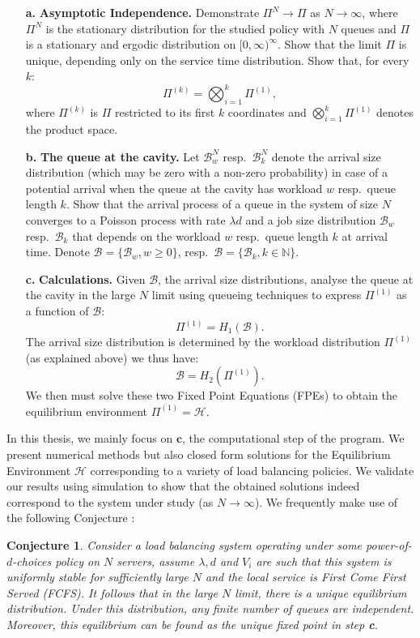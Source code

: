 \documentclass[12pt]{report}
\newtheorem{conjecture}{Conjecture}
\begin{document}
\begin{itemize}
	\item[\textbf{a.}] \textbf{Asymptotic Independence.} Demonstrate $\Pi^N \rightarrow \Pi$ as $N \rightarrow \infty$, where $\Pi^N$ is the stationary distribution for the studied policy with $N$ queues and $\Pi$ is a stationary and ergodic distribution on $[0,\infty)^\infty$. Show that the limit $\Pi$ is unique, depending only on the service time distribution. Show that, for every $k$:
	$$
	\Pi^{(k)} = \bigotimes_{i=1}^k \Pi^{(1)},
	$$
	where $\Pi^{(k)}$ is $\Pi$ restricted to its first $k$ coordinates and $\bigotimes_{i=1}^k \Pi^{(1)}$ denotes the product space.
	\item[\textbf{b.}] \textbf{The queue at the cavity.} Let $\mathcal{B}_w^N$ resp.~$\mathcal{B}_k^N$ denote the arrival size distribution (which may be zero with a non-zero probability) in case of a potential arrival when the queue at the cavity has workload $w$ resp.~queue length $k$. Show that the arrival process of a queue in the system of size $N$
	converges to a Poisson process with rate $\lambda d$ and a job size distribution $\mathcal{B}_w$ resp.~$\mathcal{B}_k$ that depends on the workload $w$ resp.~queue length $k$ at arrival time.
	Denote $\mathcal{B} = \{\mathcal{B}_w, w \geq 0\}$, resp.~$\mathcal{B} = \{\mathcal{B}_k, k \in \mathbb{N}\}$.
	\item[\textbf{c.}] \textbf{Calculations.} Given $\mathcal{B}$, the arrival size distributions, analyse the queue at the cavity in the large $N$ limit using queueing techniques to express $\Pi^{(1)}$ as a function of $\mathcal{B}$:
	$$
	\Pi^{(1)}=H_1(\mathcal{B}).
	$$
	The arrival size distribution is determined by the workload distribution $\Pi^{(1)}$ (as explained above) we thus have:
	$$
	\mathcal{B}= H_2(\Pi^{(1)}).
	$$
	We then must solve these two Fixed Point Equations (FPEs) to obtain the equilibrium environment $\Pi^{(1)} = \mathcal{H}$.
\end{itemize}
In this thesis, we mainly focus on $\textbf{c}$, the computational step of the program. We present numerical methods but also closed form solutions for the Equilibrium Environment $\mathcal{H}$ corresponding to a variety of load balancing policies. We validate our results using simulation to show that the obtained solutions indeed correspond to the system under study (as $N\rightarrow \infty$). We frequently make use of the following Conjecture :
\begin{conjecture}\label{conj1}
	Consider a load balancing system operating under some power-of-$d$-choices policy on $N$ servers, assume $\lambda,d$ and $V_i$ are such that this system is uniformly stable for sufficiently large $N$ and  the local service is First Come First Served (FCFS). It follows that in the large $N$ limit, there is a unique equilibrium distribution. Under this distribution, any finite number of queues are independent. Moreover, this equilibrium can be found as the unique fixed point in step \textbf{c}.
\end{conjecture}
\end{document}
